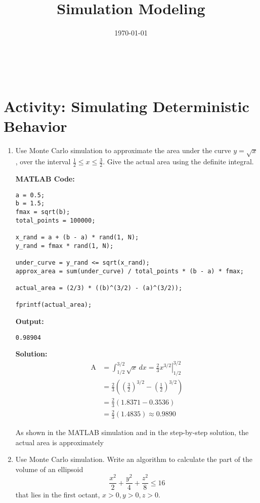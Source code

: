 \documentclass[legalpaper,11pt,extrafontsizes,oneside,openany,x11names]{memoir}
\title{Simulation Modeling}
\date{\today}
\makeatletter
\def\maketitle{
    \begin{center}
        \LARGE \textbf{\@title} \\[0.5ex]
        \large \@date
    \end{center}
}
\makeatother
\begin{document}
\maketitle


\section*{Activity: Simulating Deterministic Behavior}

\begin{enumerate}
    \item Use Monte Carlo simulation to approximate the area under the curve \( y = \sqrt{x} \), over the interval \( \frac{1}{2} \leq x \leq \frac{3}{2} \). Give the actual area using the definite integral.

     \textbf{MATLAB Code:}
    \begin{lstlisting}
a = 0.5;
b = 1.5;
fmax = sqrt(b);
total_points = 100000;

x_rand = a + (b - a) * rand(1, N);     
y_rand = fmax * rand(1, N);            

under_curve = y_rand <= sqrt(x_rand);
approx_area = sum(under_curve) / total_points * (b - a) * fmax;

actual_area = (2/3) * ((b)^(3/2) - (a)^(3/2));

fprintf(actual_area);
    \end{lstlisting}

    \textbf{Output:}

    \begin{lstlisting}
0.98904
    \end{lstlisting}


\textbf{Solution:}
\begin{align*}
\text{A} 
&= \int_{1/2}^{3/2} \sqrt{x} \, dx = \left. \frac{2}{3} x^{3/2} \right|_{1/2}^{3/2} \\
&= \frac{2}{3} \left( \left( \frac{3}{2} \right)^{3/2} - \left( \frac{1}{2} \right)^{3/2} \right) \\
&= \frac{2}{3} (1.8371 - 0.3536) \\
&= \frac{2}{3} (1.4835) \approx 0.9890
\end{align*}

As shown in the MATLAB simulation and in the step-by-step solution, the actual area is approximately 

    
    \item Use Monte Carlo simulation. Write an algorithm to calculate the part of the volume of an ellipsoid 
    \[
    \frac{x^2}{2} + \frac{y^2}{4} + \frac{z^2}{8} \leq 16
    \]
    that lies in the first octant, \( x > 0, y > 0, z > 0 \).


\end{enumerate}
\end{document}
